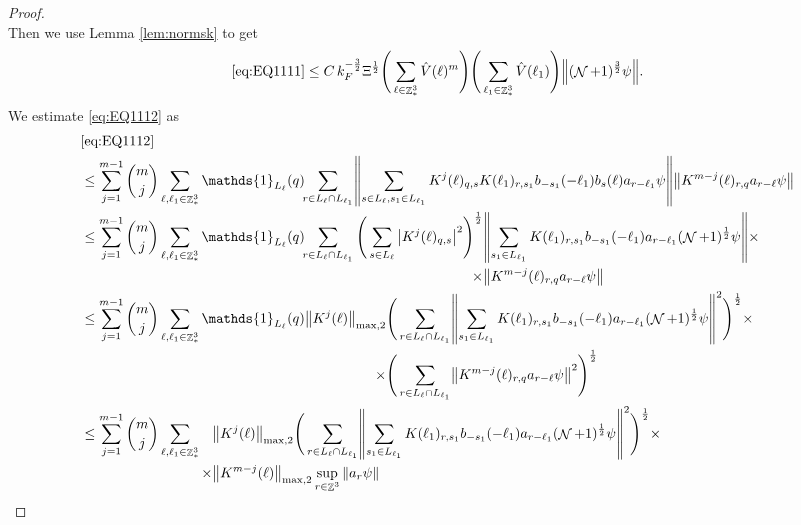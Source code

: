 \documentclass[sn-mathphys, Numbered ,a4paper]{sn-jnl}%
\DeclareMathOperator{\Z}{\mathbb{Z}}
\DeclareMathOperator{\NN}{\mathcal{N}}
\newcommand{\half}{\frac{1}{2}}
\theoremstyle{plain}
\theoremstyle{definition}
\theoremstyle{remark}
\theoremstyle{plain}
\theoremstyle{definition}
\theoremstyle{remark}
\begin{document}
\begin{proof}
\begin{equation}
\end{equation}
Then we use Lemma \ref{lem:normsk} to get
\begin{equation}
	 \eqref{eq:EQ1111}\leq C\, k_{F}^{-\frac{3}{2}} \Xi^\half \Bigg(\sum\limits_{\ell \in \Z^3_*} \hat{V}(\ell)^m\Bigg)\Bigg( \sum\limits_{\ell_1 \in \Z^3_*} \hat{V}(\ell_1) \Bigg) \norm { (\NN+1)^{\frac{3}{2}} \psi }. \label{eq:estEQ1111} 
\end{equation}
We estimate \eqref{eq:EQ1112} as 
\begin{alignat}{2}
	&\eqref{eq:EQ1112}\nonumber\\
	&\leq \sum\limits_{j=1}^{m-1} {{m}\choose j} \sum\limits_{\ell, \ell_1\in \Z^3_*} \mathds{1}_{L_{\ell}}(q)\!\! \sum\limits_{r\in L_{\ell} \cap L_{\ell_1}}\! \norm{ \sum\limits_{s \in L_\ell, s_1 \in L_{\ell_1}} K^{j}(\ell)_{q,s} K(\ell_1)_{r,s_1} b_{-s_1}(-\ell_1) b_{s}(\ell) a_{r-\ell_1}\psi}\norm{  K^{m-j}(\ell)_{r,q} a_{r-\ell} \psi } \nonumber\\
	&\leq \sum\limits_{j=1}^{m-1} {{m}\choose j} \sum\limits_{\ell, \ell_1\in \Z^3_*} \mathds{1}_{L_{\ell}}(q)\!\! \sum\limits_{r\in L_{\ell} \cap L_{\ell_1}}\! \begin{aligned}[t]\Bigg( \sum\limits_{s \in L_\ell}\abs{K^{j}(\ell)_{q,s}}^2\Bigg)^\half &\norm{ \sum\limits_{ s_1 \in L_{\ell_1}}  K(\ell_1)_{r,s_1} b_{-s_1}(-\ell_1)  a_{r-\ell_1}(\NN+1)^\half\psi}\times \nonumber\\ \times&\norm{  K^{m-j}(\ell)_{r,q} a_{r-\ell} \psi } \end{aligned} \nonumber\\
	&\leq \sum\limits_{j=1}^{m-1} {{m}\choose j} \sum\limits_{\ell, \ell_1\in \Z^3_*} \begin{aligned}[t] \mathds{1}_{L_{\ell}}(q) \norm{K^{j}(\ell)}_{\mathrm{max,2}} &\Bigg( \sum\limits_{r\in L_{\ell} \cap L_{\ell_1}}\! \norm{ \sum\limits_{ s_1 \in L_{\ell_1}}  K(\ell_1)_{r,s_1} b_{-s_1}(-\ell_1)  a_{r-\ell_1}(\NN+1)^\half\psi} ^2\Bigg)^\half \times\nonumber\\ \quad\times&\Bigg( \sum\limits_{r\in L_{\ell} \cap L_{\ell_1}}\!\norm{  K^{m-j}(\ell)_{r,q} a_{r-\ell} \psi }^2\Bigg)^\half \end{aligned}\nonumber\\
	&\leq \sum\limits_{j=1}^{m-1} {{m}\choose j} \sum\limits_{\ell, \ell_1\in \Z^3_*} \begin{aligned}[t] &\norm{K^{j}(\ell)}_{\mathrm{max,2}}  \Bigg( \sum\limits_{r\in L_{\ell} \cap L_{\ell_1}}\! \norm{ \sum\limits_{ s_1 \in L_{\ell_1}}  K(\ell_1)_{r,s_1} b_{-s_1}(-\ell_1)  a_{r-\ell_1} (\NN+1)^\half \psi} ^2\Bigg)^\half \times \nonumber\\ \times & \norm{K^{m-j}(\ell)}_{\mathrm{max,2}} \sup_{r \in \Z^3}\norm{a_r\psi}\end{aligned} \nonumber\\

\end{alignat}
\end{proof}
\end{document}
